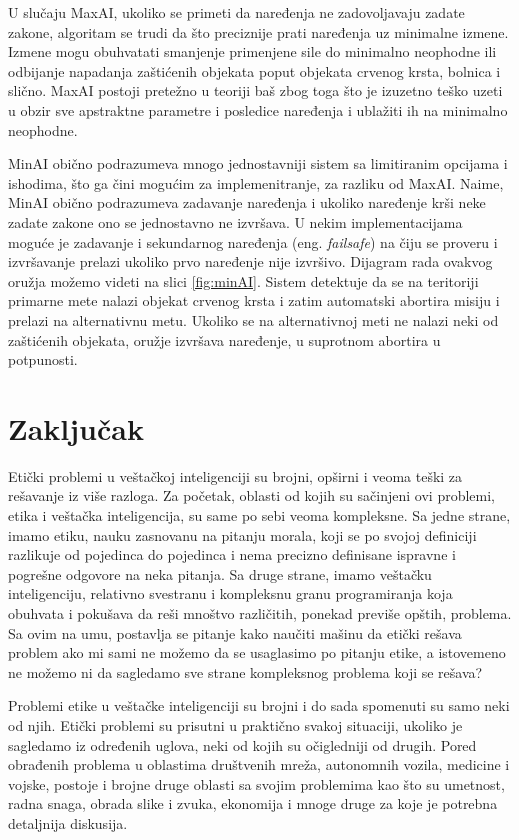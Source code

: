 \documentclass[a4paper]{article}
\begin{document}
U slučaju MaxAI, ukoliko se primeti da naređenja ne zadovoljavaju zadate zakone, algoritam se trudi da što preciznije prati naređenja uz minimalne izmene. Izmene mogu obuhvatati smanjenje primenjene sile do minimalno neophodne ili odbijanje napadanja zaštićenih objekata poput objekata crvenog krsta, bolnica i slično. MaxAI postoji pretežno u teoriji baš zbog toga što je izuzetno teško uzeti u obzir sve apstraktne parametre i posledice naređenja i ublažiti ih na minimalno neophodne.

MinAI obično podrazumeva mnogo jednostavniji sistem sa limitiranim opcijama i ishodima, što ga čini mogućim za implemenitranje, za razliku od MaxAI. Naime, MinAI obično podrazumeva zadavanje naređenja i ukoliko naređenje krši neke zadate zakone ono se jednostavno ne izvršava. U nekim implementacijama moguće je zadavanje i sekundarnog naređenja (eng. \textit{failsafe}) na čiju se proveru i izvršavanje prelazi ukoliko prvo naređenje nije izvršivo. Dijagram rada ovakvog oružja možemo videti na slici \ref{fig:minAI}. Sistem detektuje da se na teritoriji primarne mete nalazi objekat crvenog krsta i zatim automatski abortira misiju i prelazi na alternativnu metu. Ukoliko se na alternativnoj meti ne nalazi neki od zaštićenih objekata, oružje izvršava naređenje, u suprotnom abortira u potpunosti.


\section{Zaključak}
\label{sec: Zaključak}
Etički problemi u veštačkoj inteligenciji su brojni, opširni i veoma teški za rešavanje iz više razloga. Za početak, oblasti od kojih su sačinjeni ovi problemi, etika i veštačka inteligencija, su same po sebi veoma kompleksne. Sa jedne strane, imamo etiku, nauku zasnovanu na pitanju morala, koji se po svojoj definiciji razlikuje od pojedinca do pojedinca i nema precizno definisane ispravne i pogrešne odgovore na neka pitanja. Sa druge strane, imamo veštačku inteligenciju, relativno svestranu i kompleksnu granu programiranja koja obuhvata i pokušava da reši mnoštvo različitih, ponekad previše opštih, problema. Sa ovim na umu, postavlja se pitanje kako naučiti mašinu da etički rešava problem ako mi sami ne možemo da se usaglasimo po pitanju etike, a istovemeno ne možemo ni da sagledamo sve strane kompleksnog problema koji se rešava?

Problemi etike u veštačke inteligenciji su brojni i do sada spomenuti su samo neki od njih. Etički problemi su prisutni u praktično svakoj situaciji, ukoliko je sagledamo iz određenih uglova, neki od kojih su očigledniji od drugih. Pored obrađenih problema u oblastima društvenih mreža, autonomnih vozila, medicine i vojske, postoje i brojne druge oblasti sa svojim problemima kao što su umetnost, radna snaga, obrada slike i zvuka, ekonomija i mnoge druge za koje je potrebna detaljnija diskusija.
\newpage
{}
\appendix
 

\appendix
\end{document}
